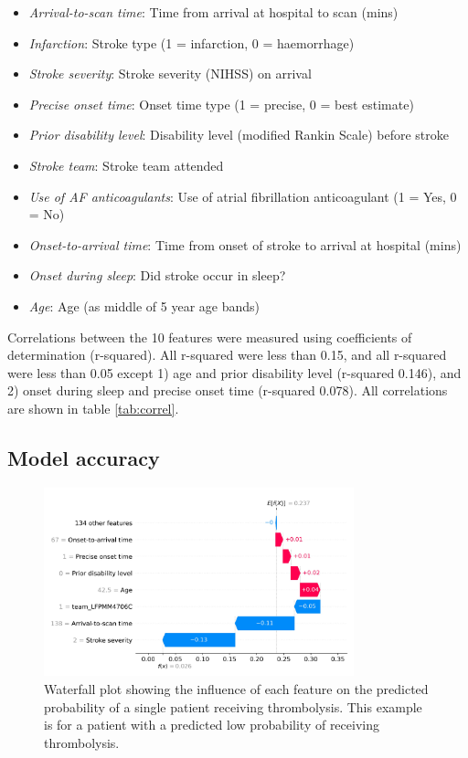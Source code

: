 \begin{itemize}
    \item \emph{Arrival-to-scan time}: Time from arrival at hospital to scan (mins)
    \item \emph{Infarction}: Stroke type (1 = infarction, 0 = haemorrhage)
    \item \emph{Stroke severity}: Stroke severity (NIHSS) on arrival
    \item \emph{Precise onset time}: Onset time type (1 = precise, 0 = best estimate)
    \item \emph{Prior disability level}: Disability level (modified Rankin Scale) before stroke
    \item \emph{Stroke team}: Stroke team attended
    \item \emph{Use of AF anticoagulants}: Use of atrial fibrillation anticoagulant (1 = Yes, 0 = No)
    \item \emph{Onset-to-arrival time}: Time from onset of stroke to arrival at hospital (mins)
    \item \emph{Onset during sleep}: Did stroke occur in sleep?
    \item \emph{Age}: Age (as middle of 5 year age bands)
\end{itemize}

Correlations between the 10 features were measured using coefficients of determination (r-squared). All r-squared were less than 0.15, and all r-squared were less than 0.05 except 1) age and prior disability level (r-squared 0.146), and 2) onset during sleep and precise onset time (r-squared 0.078). All correlations are shown in table \ref{tab:correl}.

\subsection{Model accuracy}



\begin{figure}
\centering
\includegraphics[width=0.8\textwidth]{./images/03_xgb_10_features_waterfall_probability_low}
\caption{Waterfall plot showing the influence of each feature on the predicted probability of a single patient receiving thrombolysis. This example is for a patient with a predicted low probability of receiving thrombolysis.}
\end{figure}

